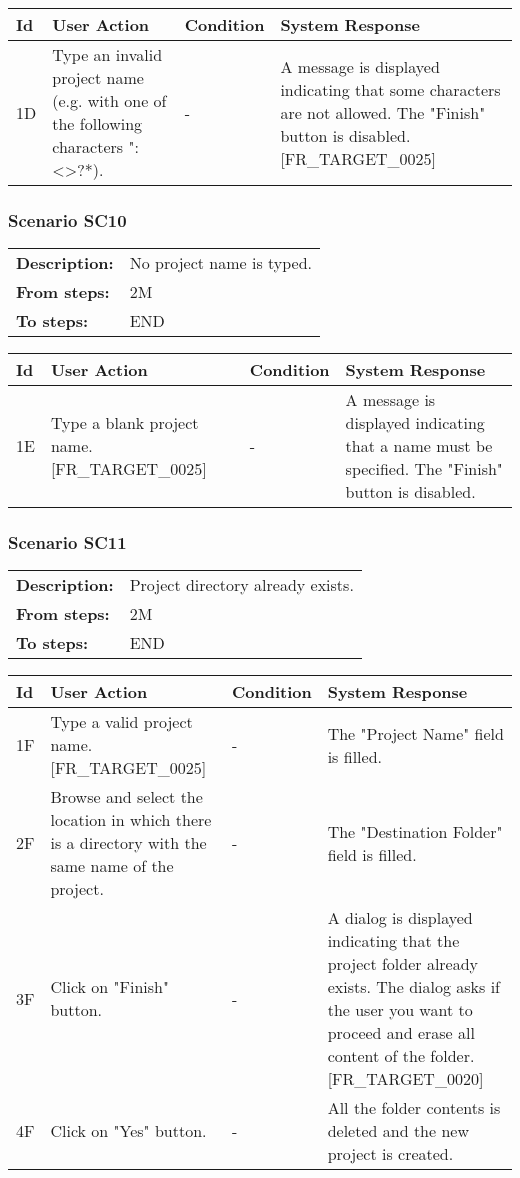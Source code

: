\documentclass[a4paper,11pt]{article}
\newcommand{\bl}{\\ \hline}
\begin{document}
\begin{tabular}{|p{0.8in}|p{1.6in}|p{1.6in}|p{1.6in}|}
\hline
Id & User Action & Condition & System Response  \bl 
1D & Type an invalid project name (e.g. with one of the
						following characters ":\/<>?*). & - & A message is displayed indicating that some characters
						are not allowed. The "Finish" button is disabled. [FR_TARGET_0025]
					 \bl 
\end{tabular}
\subsubsection*{Scenario SC10}
\begin{tabular}{p{1in}p{4in}}
{\bf Description:} & No project name is typed. \\
{\bf From steps:} & 2M \\
{\bf To steps:} & END \\
\end{tabular}
 
\begin{tabular}{|p{0.8in}|p{1.6in}|p{1.6in}|p{1.6in}|}
\hline
Id & User Action & Condition & System Response  \bl 
1E & Type a blank project name. [FR_TARGET_0025] & - & A message is displayed indicating that a name must be
						specified. The "Finish" button is disabled.  \bl 
\end{tabular}
\subsubsection*{Scenario SC11}
\begin{tabular}{p{1in}p{4in}}
{\bf Description:} &  Project directory already exists. \\
{\bf From steps:} & 2M \\
{\bf To steps:} & END \\
\end{tabular}
 
\begin{tabular}{|p{0.8in}|p{1.6in}|p{1.6in}|p{1.6in}|}
\hline
Id & User Action & Condition & System Response  \bl 
1F & Type a valid project name. [FR_TARGET_0025] & - & The "Project Name" field is filled.  \bl 
2F & Browse and select the location in which there is a
						directory with the same name of the project. & - & The "Destination Folder" field is filled.  \bl 
3F & Click on "Finish" button. & - & A dialog is displayed indicating that the project folder
						already exists. The dialog asks if the user you want to proceed
						and erase all content of the folder. [FR_TARGET_0020] \bl 
4F & Click on "Yes" button. & - & All the folder contents is deleted and the new project is
						created.  \bl 
\end{tabular}
\end{document}
